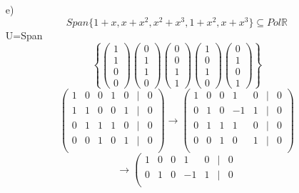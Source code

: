 \documentclass{article}
\begin{document}
\begin{enumerate}
        \item[e)]\[Span\{1+x, x+x^2, x^2+x^3,1+x^2,x+x^3\}\subseteq Pol \mathbb{R}\]
        \newline
        U=Span\[\left\{
            \left(\begin{array}{c}1\\1\\0\\0\end{array}\right)
            \left(\begin{array}{c}0\\1\\1\\0\end{array}\right)
            \left(\begin{array}{c}0\\0\\1\\1\end{array}\right)
            \left(\begin{array}{c}1\\0\\1\\0\end{array}\right)
            \left(\begin{array}{c}0\\1\\0\\1\end{array}\right)
        \right\}\]
        \[
        \left( \begin{array}{ccccccc}
            1&0&0&1&0&|&0\\
            1&1&0&0&1&|&0\\
            0&1&1&1&0&|&0\\
            0&0&1&0&1&|&0\\
        \end{array}\right)
        \rightarrow
        \left( \begin{array}{ccccccc}
            1&0&0&1&0&|&0\\
            0&1&0&-1&1&|&0\\
            0&1&1&1&0&|&0\\
            0&0&1&0&1&|&0\\
        \end{array}\right)
        \]
        \[
        \rightarrow
        \left( \begin{array}{ccccccc}
            1&0&0&1&0&|&0\\
            0&1&0&-1&1&|&0\\

\end{array}\]
\end{enumerate}
\end{document}
